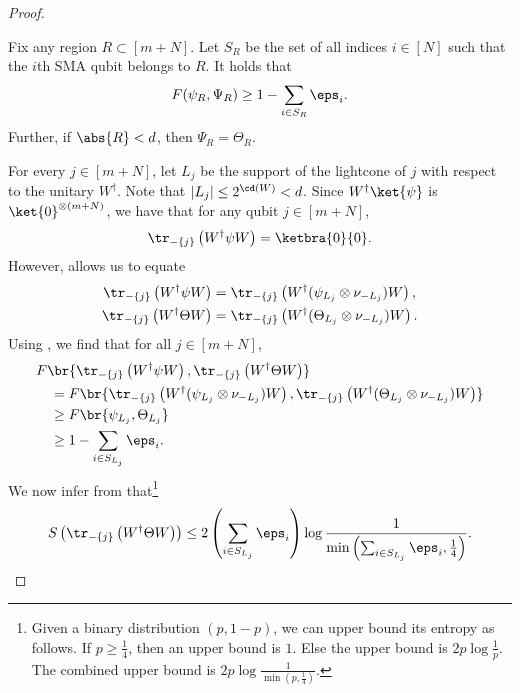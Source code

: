 \documentclass{toc}
\begin{document}
\begin{proof}
\begin{claim}
\label{clm:gentlemeas}
Fix any region $R\subset [m+N]$. Let $S_R$ be the set of all indices $i\in [N]$ such that the $i$th SMA qubit belongs to $R$. It holds that 
%
%
\begin{align}
\label{eq:closelowen}
F(\psi_R,\Psi_R)\geq 1-\sum_{i\in S_R}\eps_i.
\end{align}
Further, if $\abs{R}<d$, then $\Psi_R=\Theta_R$.
\end{claim}
For every $j\in [m+N]$, let $L_j$ be the support of the lightcone of $j$ with respect to the unitary $W^{\dagger}$. Note that $|L_j|\leq 2^{\cd(W)} < d$. Since $W^{\dagger}\ket{\psi}$ is $\ket{0}^{\otimes(m+N)}$, we have that for any qubit $j\in [m+N]$,
\begin{align}
\label{eq:purezeroent}
    \tr_{-\{j\}} \left( W^\dagger \psi W \right) = \ketbra{0}{0}.
\end{align}
However,  allows us to equate
\begin{align}
\tr_{- \{j\}} \left( W^\dagger \psi W \right) &= \tr_{- \{j\}} \left( W^\dagger (\psi_{L_j}\otimes \nu_{-L_j}) W \right), \\
\tr_{- \{j\}} \left( W^\dagger \Theta W \right) &= \tr_{- \{j\}} \left( W^\dagger (\Theta_{L_j}\otimes \nu_{-L_j}) W \right).
\end{align}
Using , we find that for all $j \in [m+N]$,
\begin{align}
& F\br{\tr_{-\{j\}} \left( W^\dagger \psi W \right), \tr_{-\{j\}} \left(W^\dagger \Theta W \right)} \\
&\quad = F\br{ \tr_{-\{j\}} \left( W^\dagger (\psi_{L_j}\otimes \nu_{-L_j}) W \right), \tr_{-\{j\}} \left(W^\dagger (\Theta_{L_j}\otimes \nu_{-L_j}) W \right)} \\
&\quad \geq F\br{\psi_{L_j},\Theta_{L_j}} \\
&\quad \geq 1-\sum_{i\in S_{L_j}}\eps_i. \label{eq:psicloseto0}
\end{align}
We now infer from   that\footnote{Given a binary distribution $(p,1-p)$, we can upper bound its entropy as follows. If $p\geq \frac{1}{4}$, then an upper bound is $1$. Else the upper bound is $2p\log\frac{1}{p}$. The combined upper bound is $2p\log\frac{1}{\min(p,\frac{1}{4})}$.}
\begin{align}
    S \left( \tr_{-\{j\}} \left(W^\dagger \Theta W\right) \right) \leq  2\left(\sum_{i\in S_{L_j}}\eps_i\right)\log \frac{1}{\min\left(\sum_{i\in S_{L_j}}\eps_i, \frac{1}{4}\right)}.

\end{align}
\end{proof}
\end{document}
